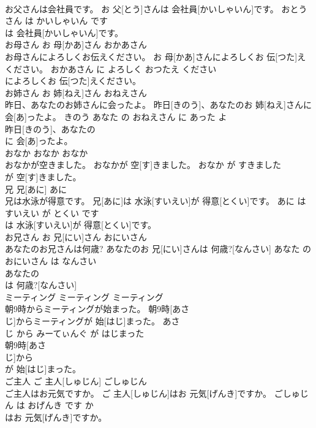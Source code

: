 \documentclass[8pt]{extreport}
\begin{document}
\begin{CJK}{UTF8}{min}
\\	お父さんは会社員です。	お 父[とう]さんは 会社員[かいしゃいん]です。	おとうさん は かいしゃいん です	
\\	は 会社員[かいしゃいん]です。			
\\	お母さん	お 母[かあ]さん	おかあさん	
\\	お母さんによろしくお伝えください。	お 母[かあ]さんによろしくお 伝[つた]えください。	おかあさん に よろしく おつたえ ください	
\\	によろしくお 伝[つた]えください。			
\\	お姉さん	お 姉[ねえ]さん	おねえさん	
\\	昨日、あなたのお姉さんに会ったよ。	昨日[きのう]、あなたのお 姉[ねえ]さんに 会[あ]ったよ。	きのう あなた の おねえさん に あった よ	
\\	昨日[きのう]、あなたの
\\	に 会[あ]ったよ。			
\\	おなか	おなか	おなか	
\\	おなかが空きました。	おなかが 空[す]きました。	おなか が すきました	
\\	が 空[す]きました。			
\\	兄	兄[あに]	あに	
\\	兄は水泳が得意です。	兄[あに]は 水泳[すいえい]が 得意[とくい]です。	あに は すいえい が とくい です	
\\	は 水泳[すいえい]が 得意[とくい]です。			
\\	お兄さん	お 兄[にい]さん	おにいさん	
\\	あなたのお兄さんは何歳?	あなたのお 兄[にい]さんは 何歳?[なんさい]	あなた の おにいさん は なんさい	
\\	あなたの
\\	は 何歳?[なんさい]			
\\	ミーティング	ミーティング	ミーティング	
\\	朝9時からミーティングが始まった。	朝9時[あさ 
\\	じ]からミーティングが 始[はじ]まった。	あさ 
\\	じ から みーてぃんぐ が はじまった	
\\	朝9時[あさ 
\\	じ]から
\\	が 始[はじ]まった。			
\\	ご主人	ご 主人[しゅじん]	ごしゅじん	
\\	ご主人はお元気ですか。	ご 主人[しゅじん]はお 元気[げんき]ですか。	ごしゅじん は おげんき です か	
\\	はお 元気[げんき]ですか。			

\end{CJK}
\end{document}
